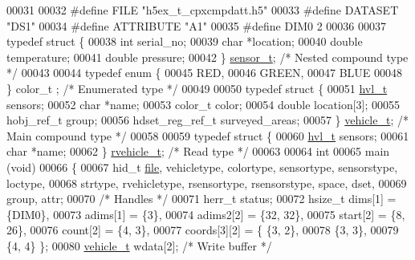 \begin{DoxyCode}
00031 
00032 \textcolor{preprocessor}{#define FILE            "h5ex\_t\_cpxcmpdatt.h5"}
00033 \textcolor{preprocessor}{#define DATASET         "DS1"}
00034 \textcolor{preprocessor}{#define ATTRIBUTE       "A1"}
00035 \textcolor{preprocessor}{#define DIM0            2}
00036 
00037 \textcolor{keyword}{typedef} \textcolor{keyword}{struct }\{
00038     \textcolor{keywordtype}{int}     serial\_no;
00039     \textcolor{keywordtype}{char}    *location;
00040     \textcolor{keywordtype}{double}  temperature;
00041     \textcolor{keywordtype}{double}  pressure;
00042 \} \hyperlink{structsensor__t}{sensor\_t};                                 \textcolor{comment}{/* Nested compound type */}
00043 
00044 \textcolor{keyword}{typedef} \textcolor{keyword}{enum} \{
00045     RED,
00046     GREEN,
00047     BLUE
00048 \} color\_t  ;                                \textcolor{comment}{/* Enumerated type */}
00049 
00050 \textcolor{keyword}{typedef} \textcolor{keyword}{struct }\{
00051     \hyperlink{structhvl__t}{hvl\_t}               sensors;
00052     \textcolor{keywordtype}{char}                *name;
00053     color\_t             color;
00054     \textcolor{keywordtype}{double}              location[3];
00055     hobj\_ref\_t          group;
00056     hdset\_reg\_ref\_t     surveyed\_areas;
00057 \} \hyperlink{structvehicle__t}{vehicle\_t};                                \textcolor{comment}{/* Main compound type */}
00058 
00059 \textcolor{keyword}{typedef} \textcolor{keyword}{struct }\{
00060     \hyperlink{structhvl__t}{hvl\_t}       sensors;
00061     \textcolor{keywordtype}{char}        *name;
00062 \} \hyperlink{structrvehicle__t}{rvehicle\_t};                               \textcolor{comment}{/* Read type */}
00063 
00064 \textcolor{keywordtype}{int}
00065 main (\textcolor{keywordtype}{void})
00066 \{
00067     hid\_t       \hyperlink{structfile}{file}, vehicletype, colortype, sensortype, sensorstype, loctype,
00068                 strtype, rvehicletype, rsensortype, rsensorstype, space, dset,
00069                 group, attr;
00070                                             \textcolor{comment}{/* Handles */}
00071     herr\_t      status;
00072     hsize\_t     dims[1] = \{DIM0\},
00073                 adims[1] = \{3\},
00074                 adims2[2] = \{32, 32\},
00075                 start[2] = \{8, 26\},
00076                 count[2] = \{4, 3\},
00077                 coords[3][2] = \{ \{3, 2\},
00078                                  \{3, 3\},
00079                                  \{4, 4\} \};
00080     \hyperlink{structvehicle__t}{vehicle\_t}   wdata[2];                   \textcolor{comment}{/* Write buffer */}

\end{DoxyCode}
